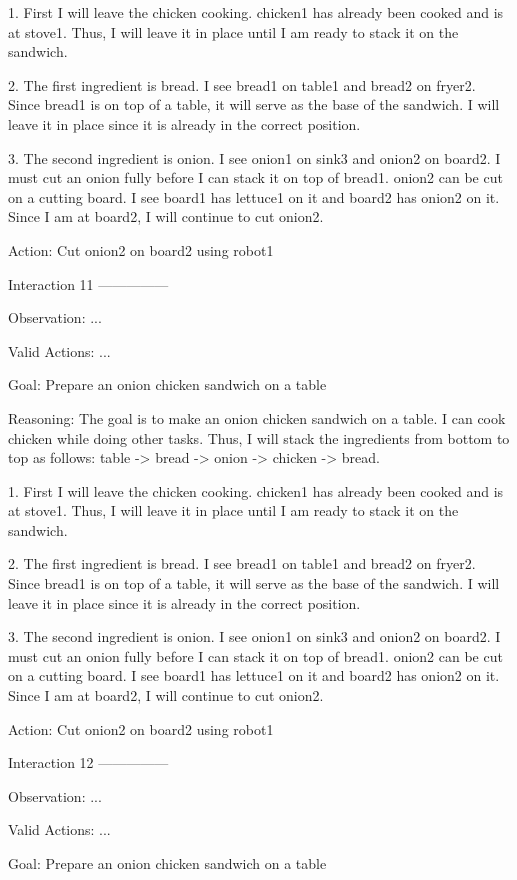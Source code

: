 1. First I will leave the chicken cooking. chicken1 has already been cooked and is at stove1. Thus, I will leave it in place until I am ready to stack it on the sandwich.

2. The first ingredient is bread. I see bread1 on table1 and bread2 on fryer2. Since bread1 is on top of a table, it will serve as the base of the sandwich. I will leave it in place since it is already in the correct position.

3. The second ingredient is onion. I see onion1 on sink3 and onion2 on board2. I must cut an onion fully before I can stack it on top of bread1. onion2 can be cut on a cutting board. I see board1 has lettuce1 on it and board2 has onion2 on it. Since I am at board2, I will continue to cut onion2.

Action: Cut onion2 on board2 using robot1


Interaction 11
---------------


Observation: ...

Valid Actions: ...

Goal: Prepare an onion chicken sandwich on a table


Reasoning: The goal is to make an onion chicken sandwich on a table. I can cook chicken while doing other tasks. Thus, I
will stack the ingredients from bottom to top as follows: table -> bread -> onion -> chicken -> bread.

1. First I will leave the chicken cooking. chicken1 has already been cooked and is at stove1. Thus, I will leave it in place until I am ready to stack it on the sandwich.

2. The first ingredient is bread. I see bread1 on table1 and bread2 on fryer2. Since bread1 is on top of a table, it will serve as the base of the sandwich. I will leave it in place since it is already in the correct position.

3. The second ingredient is onion. I see onion1 on sink3 and onion2 on board2. I must cut an onion fully before I can stack it on top of bread1. onion2 can be cut on a cutting board. I see board1 has lettuce1 on it and board2 has onion2 on it. Since I am at board2, I will continue to cut onion2.

Action: Cut onion2 on board2 using robot1


Interaction 12
---------------


Observation: ...

Valid Actions: ...

Goal: Prepare an onion chicken sandwich on a table


